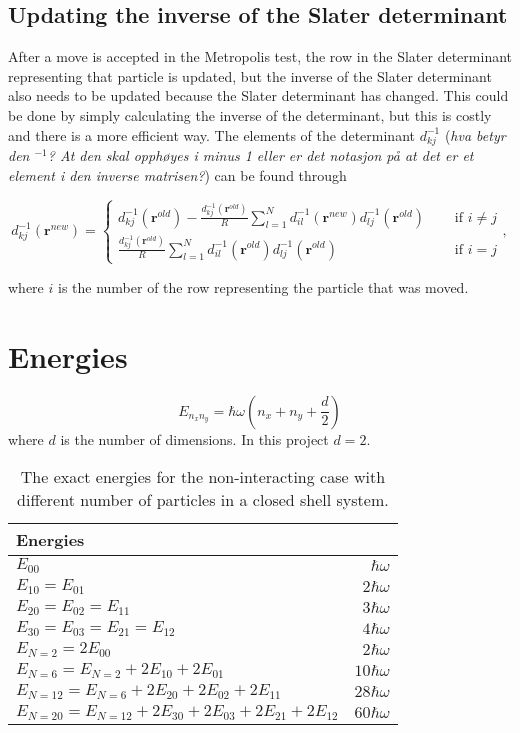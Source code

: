 \subsection{Updating the inverse of the Slater determinant}

After a move is accepted in the Metropolis test, the row in the Slater determinant representing that particle is updated, but the inverse of the Slater determinant also needs to be updated because the Slater determinant has changed. This could be done by simply calculating the inverse of the determinant, but this is costly and there is a more efficient way. The elements of the determinant $d_{kj}^{-1}$ (\textit{hva betyr den $^{-1}$? At den skal opphøyes i minus 1 eller er det notasjon på at det er et element i den inverse matrisen?}) can be found through

$$ d_{kj}^{-1}(\bm{r}^{new}) = \left\{ \begin{matrix}
d_{kj}^{-1}(\bm{r}^{old})- \frac{d_{kj}^{-1}(\bm{r}^{old})}{R}\sum_{l=1}^N d_{il}^{-1}(\bm{r}^{new})d_{lj}^{-1}(\bm{r}^{old}) &\quad \text{ if } i \neq j \\
\frac{d_{kj}^{-1}(\bm{r}^{old})}{R}\sum_{l=1}^N d_{il}^{-1}(\bm{r}^{old})d_{lj}^{-1}(\bm{r}^{old}) &\quad \text{ if } i = j
\end{matrix} \right. , $$

where $i$ is the number of the row representing the particle that was moved. 

\section{Energies}

\begin{equation}
E_{n_xn_y} = \hbar \omega (n_x + n_y + \frac{d}{2})
\end{equation} where $d$ is the number of dimensions. In this project $d=2$.

\begin{table}[H]\caption{The exact energies for the non-interacting case with different number of particles in a closed shell system.}\label{tab:exact_energies_non_interacting}
\center
\begin{tabular}{l|r}
Energies & \\ \hline
$E_{00}$ & $ \hbar \omega$ \\
$E_{10} = E_{01}$ & $2 \hbar \omega$\\
$E_{20} = E_{02} = E_{11}$ & $3 \hbar \omega$\\
$E_{30} = E_{03} = E_{21}= E_{12}$ & $4 \hbar \omega$\\ \hline
$E_{N=2} = 2E_{00}$ & $2 \hbar \omega$\\
$E_{N=6} = E_{N=2} + 2E_{10} + 2E_{01}$ &$ 10 \hbar \omega$\\
$E_{N=12} = E_{N=6} + 2E_{20} +2 E_{02} + 2E_{11}$ &$ 28 \hbar \omega$\\
$E_{N=20} = E_{N=12} + 2E_{30} + 2E_{03} + 2E_{21}+ 2E_{12}$ &$ 60 \hbar \omega$\\
\end{tabular}
\end{table}

